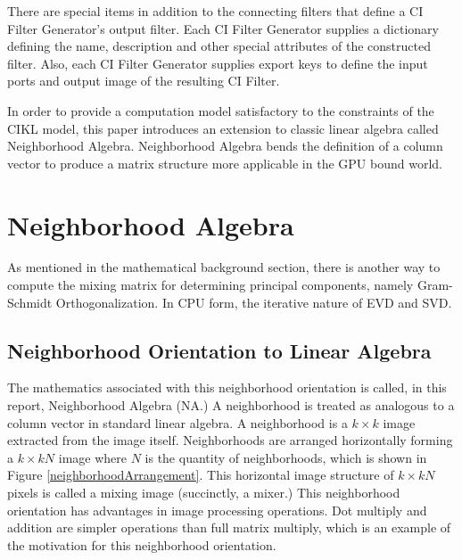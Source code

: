 \documentclass[11pt]{article}
\begin{document}
There are special items in addition to the connecting filters that define a CI Filter Generator's output filter.  Each CI Filter Generator supplies a dictionary defining the name, description and other special attributes of the constructed filter.  Also, each CI Filter Generator supplies export keys to define the input ports and output image of the resulting CI Filter.

In order to provide a computation model satisfactory to the constraints of the CIKL model, this paper introduces an extension to classic linear algebra called Neighborhood Algebra.  Neighborhood Algebra bends the definition of a column vector to produce a matrix structure more applicable in the GPU bound world.  

\section{Neighborhood Algebra}\label{neighborhood-algebra}
As mentioned in the mathematical background section, there is another way to compute the mixing matrix for determining principal components, namely Gram-Schmidt Orthogonalization.  In CPU form, the iterative nature of EVD and SVD.


\subsection{Neighborhood Orientation to Linear Algebra}
The mathematics associated with this neighborhood orientation is called, in this report, Neighborhood Algebra (NA.)   A neighborhood is treated as analogous to a column vector in standard linear algebra.  A neighborhood is a $k \times k$ image extracted from the image itself.  Neighborhoods are arranged horizontally forming a $k \times kN$ image where $N$ is the quantity of neighborhoods, which is shown in Figure \ref{neighborhoodArrangement}.  %
This horizontal image structure of $k \times kN$ pixels is called a mixing image (succinctly, a mixer.)
This neighborhood orientation has advantages in image processing operations.  Dot multiply and addition are simpler operations than full matrix multiply, which is an example of the motivation for this neighborhood orientation.   
\end{document}
